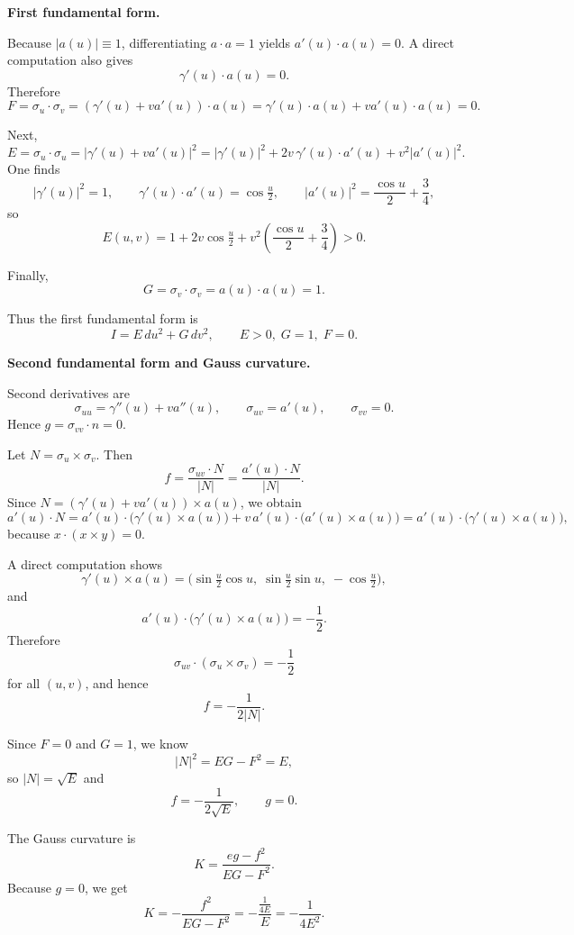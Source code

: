 \begin{solution}
\par\medskip\noindent\textbf{First fundamental form.}\par\smallskip

Because $|a(u)|\equiv 1$, differentiating $a\cdot a=1$ yields
$a'(u)\cdot a(u)=0$.
A direct computation also gives
\[
\gamma'(u)\cdot a(u)=0.
\]
Therefore
\[
F = \sigma_u\cdot\sigma_v
= (\gamma'(u)+v a'(u))\cdot a(u)
= \gamma'(u)\cdot a(u) + v a'(u)\cdot a(u) = 0.
\]

Next,
\[
E = \sigma_u\cdot\sigma_u
= |\gamma'(u)+v a'(u)|^2
= |\gamma'(u)|^2 + 2v\,\gamma'(u)\cdot a'(u) + v^2|a'(u)|^2.
\]
One finds
\[
|\gamma'(u)|^2 = 1,\qquad
\gamma'(u)\cdot a'(u) = \cos\tfrac u2,\qquad
|a'(u)|^2 = \frac{\cos u}{2} + \frac34,
\]
so
\[
E(u,v) = 1 + 2v\cos\tfrac u2
+ v^2\left(\frac{\cos u}{2}+\frac34\right) > 0.
\]

Finally,
\[
G = \sigma_v\cdot\sigma_v = a(u)\cdot a(u) = 1.
\]

Thus the first fundamental form is
\[
I = E\,du^2 + G\,dv^2,\qquad
E>0,\; G=1,\; F=0.
\]

\par\medskip\noindent\textbf{Second fundamental form and Gauss curvature.}\par\smallskip

Second derivatives are
\[
\sigma_{uu}=\gamma''(u)+v a''(u),\qquad
\sigma_{uv}=a'(u),\qquad
\sigma_{vv}=0.
\]
Hence $g=\sigma_{vv}\cdot n=0$.

Let $N=\sigma_u\times\sigma_v$.
Then
\[
f = \frac{\sigma_{uv}\cdot N}{|N|}
= \frac{a'(u)\cdot N}{|N|}.
\]
Since $N=(\gamma'(u)+v a'(u))\times a(u)$, we obtain
\[
a'(u)\cdot N
= a'(u)\cdot\bigl(\gamma'(u)\times a(u)\bigr)
+ v\,a'(u)\cdot\bigl(a'(u)\times a(u)\bigr)
= a'(u)\cdot\bigl(\gamma'(u)\times a(u)\bigr),
\]
because $x\cdot(x\times y)=0$.

A direct computation shows
\[
\gamma'(u)\times a(u)
=\bigl(\sin\tfrac u2\cos u,\;\sin\tfrac u2\sin u,\;-\cos\tfrac u2\bigr),
\]
and
\[
a'(u)\cdot\bigl(\gamma'(u)\times a(u)\bigr)=-\frac12.
\]
Therefore
\[
\sigma_{uv}\cdot(\sigma_u\times\sigma_v) = -\frac12
\]
for all $(u,v)$, and hence
\[
f = -\frac{1}{2|N|}.
\]

Since $F=0$ and $G=1$, we know
\[
|N|^2 = EG-F^2 = E,
\]
so $|N|=\sqrt{E}$ and
\[
f = -\frac{1}{2\sqrt{E}},\qquad g=0.
\]

The Gauss curvature is
\[
K = \frac{eg-f^2}{EG-F^2}.
\]
Because $g=0$, we get
\[
K = -\frac{f^2}{EG-F^2}
= -\frac{\displaystyle\frac{1}{4E}}{E}
= -\frac{1}{4E^2}.
\]


\end{solution}
